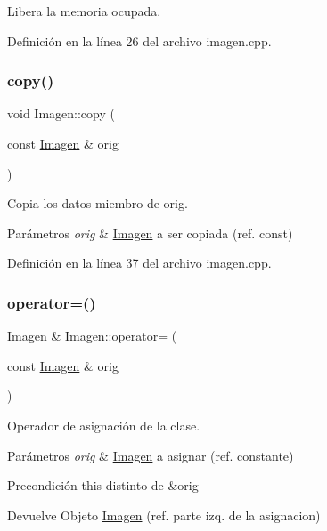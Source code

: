 Libera la memoria ocupada. 



Definición en la línea 26 del archivo imagen.\+cpp.

\mbox{\label{classImagen_af9c0798c6c770482eca1cb67e7e1ce9c}} 
\subsubsection{\texorpdfstring{copy()}{copy()}}
{\footnotesize\ttfamily void Imagen\+::copy (\begin{DoxyParamCaption}\item[{const \hyperlink{classImagen}{Imagen} \&}]{orig }\end{DoxyParamCaption})\hspace{0.3cm}{\ttfamily [private]}}



Copia los datos miembro de orig. 


\begin{DoxyParams}{Parámetros}
{\em orig} & \hyperlink{classImagen}{Imagen} a ser copiada (ref. const) \\
\hline
\end{DoxyParams}


Definición en la línea 37 del archivo imagen.\+cpp.

\mbox{\label{classImagen_a9cfdf5f496d78247026783b4026458e8}} 
\subsubsection{\texorpdfstring{operator=()}{operator=()}}
{\footnotesize\ttfamily \hyperlink{classImagen}{Imagen} \& Imagen\+::operator= (\begin{DoxyParamCaption}\item[{const \hyperlink{classImagen}{Imagen} \&}]{orig }\end{DoxyParamCaption})}



Operador de asignación de la clase. 


\begin{DoxyParams}{Parámetros}
{\em orig} & \hyperlink{classImagen}{Imagen} a asignar (ref. constante) \\
\hline
\end{DoxyParams}
\begin{DoxyPrecond}{Precondición}
this distinto de \&orig 
\end{DoxyPrecond}
\begin{DoxyReturn}{Devuelve}
Objeto \hyperlink{classImagen}{Imagen} (ref. parte izq. de la asignacion) 
\end{DoxyReturn}


